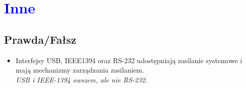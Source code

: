 \section{\textcolor{blue}{Inne}}
\subsection*{Prawda/Fałsz}
\begin{itemize}
	\item \textcolor{nie}{Interfejsy USB, IEEE1394 oraz RS-232 udostępniają zasilanie systemowe i mają mechanizmy zarządzania zasilaniem.} \\
	{\small \emph{USB i IEEE-1394 owszem, ale nie RS-232.}}
	
\end{itemize}

\newpage